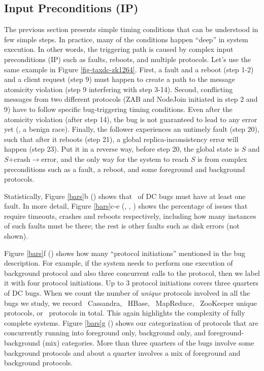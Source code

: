 



\subsection{Input Preconditions (IP)} 
\label{trig-input}


The previous section presents simple timing conditions that can be
understood in few simple steps.  In practice, many of the conditions
happen ``deep'' in system execution.  In other words, the triggering
path is caused by complex input preconditions (IP) such as faults, reboots,
and multiple protocols.  Let's use the same example in Figure
\ref{fig-taxdc-zk1264}.
%
First, a fault and a reboot (step 1-2) and a client request (step 9)
must happen to create a path to the message atomicity violation (step
9 interfering with step 3-14).
%
Second, conflicting messages from two different protocols (ZAB and
NodeJoin initiated in step 2 and 9) have to follow specific
bug-triggering timing conditions.
%
Even after the atomicity violation (after step 14), the bug is not
guaranteed to lead to any error yet (\ie, a benign race).
%
Finally, the follower experiences an untimely fault (step 20), such
that after it reboots (step 21), a global replica-inconsistency error
will happen (step 23).
%
Put it in a reverse way, before step 20, the global state is $S$
and $S$$+$crash$\rightarrow$error, and the only way for the
system to reach $S$ is from complex preconditions such as a
fault, a reboot, and some foreground and background protocols.



Statistically, Figure \ref{bars}b (\BFLT) shows that \pctFaultYes\ of
DC bugs must have at least one fault.  In more detail, Figure
\ref{bars}c-e (\BTO, \BCR, \BRB) shows the percentage of issues that
require timeouts, crashes and reboots respectively, including how many
instances of such faults must be there; the rest is other faults such
as disk errors (not shown).


Figure \ref{bars}f (\BPROT) shows how many ``protocol initiations''
mentioned in the bug description.  For example, if the system needs to
perform one execution of background protocol and also three concurrent
calls to the  protocol, then we label it with four protocol
initiations.  Up to 3 protocol initiations covers three quarters of
DC bugs.
%
When we count the number of {\em unique} protocols involved in all the
bugs we study, we record \totProtCA\ Cassandra, \totProtHB\ HBase,
\totProtMR\ MapReduce, \totProtZK\ ZooKeeper unique protocols, or
\totProtAll\ protocols in total.  This again highlights the complexity
of fully complete systems.
%
Figure \ref{bars}g (\BBFG) shows our categorization of protocols that
are concurrently running into foreground only,
background only, and foreground-background (mix)
categories.  More than three quarters of the bugs involve some
background protocols and about a quarter involves a mix of foreground
and background protocols.

